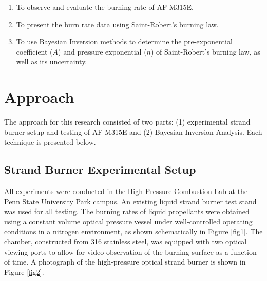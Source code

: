 \documentclass{article}
\begin{document}
\begin{enumerate}
\item To observe and evaluate the burning rate of AF-M315E.
\item To present the burn rate data using Saint-Robert's burning law.
\item To use Bayesian Inversion methods to determine the pre-exponential coefficient ($A$) and pressure exponential
($n$) of Saint-Robert's burning law, as well as its uncertainty.
\end{enumerate}

\section{Approach} \label{approach}

The approach for this research consisted of two parts: (1) experimental strand burner setup and testing of AF-M315E
and (2) Bayesian Inversion Analysis. Each technique is presented below.

\subsection{Strand Burner Experimental Setup} \label{experSetup}

All experiments were conducted in the High Pressure Combustion Lab at the Penn State University Park campus. An 
existing liquid strand burner test stand was used for all testing. The burning rates of liquid propellants were
obtained using a constant volume optical pressure vessel under well-controlled operating conditions in a nitrogen
environment, as shown schematically in Figure \ref{fig1}. The chamber, constructed from 316 stainless steel, was
equipped with two optical viewing ports to allow for video observation of the burning surface as a function of
time. A photograph of the high-pressure optical strand burner is shown in Figure \ref{fig2}.
\end{document}
